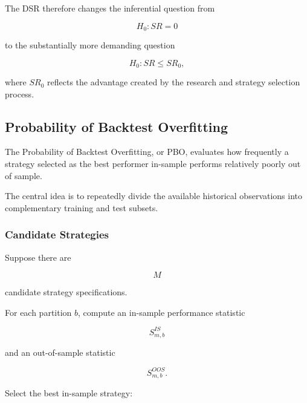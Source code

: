 \documentclass[11pt,a4paper]{article}
\begin{document}
The DSR therefore changes the inferential question from

\begin{equation}
\boxed{
H_0:
SR=0
}
\end{equation}

to the substantially more demanding question

\begin{equation}
\boxed{
H_0:
SR\leq SR_0,
}
\end{equation}

where $SR_0$ reflects the advantage created by the research and strategy
selection process.



\subsection{Probability of Backtest Overfitting}
\label{subsec:probability_backtest_overfitting}

The Probability of Backtest Overfitting, or PBO, evaluates how frequently a
strategy selected as the best performer in-sample performs relatively poorly
out of sample.

The central idea is to repeatedly divide the available historical observations
into complementary training and test subsets.


\subsubsection{Candidate Strategies}

Suppose there are

\begin{equation}
M
\end{equation}

candidate strategy specifications.

For each partition $b$, compute an in-sample performance statistic

\begin{equation}
S_{m,b}^{IS}
\end{equation}

and an out-of-sample statistic

\begin{equation}
S_{m,b}^{OOS}.
\end{equation}

Select the best in-sample strategy:
\end{document}
